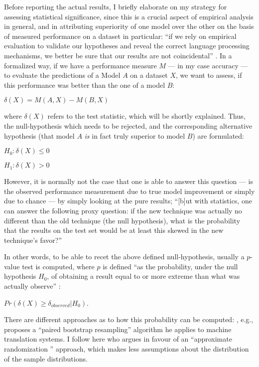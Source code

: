 Before reporting the actual results, I briefly elaborate on my strategy for
assessing statistical significance, since this is a crucial aspect of empirical
analysis in general, and in attributing superiority of one model over the other
on the basis of measured performance on a dataset in particular:
``if we rely on empirical evaluation to validate our hypotheses and reveal the
correct language processing mechanisms, we better be sure that our results are
not coincidental'' \citep{dror2018hitchhiker}. In a formalized way, if we have a
performance measure $M$ --- in my case accuracy --- to evaluate the predictions
of a Model $A$ on a dataset $X$, we want to assess, if this performance was better
than the one of a model $B$:

$\delta(X) = M(A, X) - M(B, X)$

where $\delta(X)$ refers to the test statistic, which will be shortly explained.
Thus, the null-hypothesis which needs to be rejected, and the corresponding
alternative hypothesis (that model $A$ \emph{is} in fact truly superior to model
$B$) are formulated:

$H_0:\delta(X) \leq 0$

$H_1:\delta(X) > 0$

However, it is normally not the case that one is able to answer this question --- is the observed
performance measurement due to true model improvement or simply due to chance --- by simply looking
at the pure results; ``[b]ut with statistics, one can answer the following proxy question: if the
new technique was actually no different than the old technique (the null hypothesis), what is the
probability that the results on the test set would be at least this skewed in the new technique’s
favor?'' \citep{yeh2000more}

In other words, to be able to recet the above defined null-hypothesis, usually a $p$-value test is
computed, where $p$ is defined ``as the probability, under the null hypothesis $H_0$, of obtaining
a result equal to or more extreme than what was actually observe'' \citep[p.~1384]{dror2018hitchhiker}:

$Pr(\delta(X) \geq \delta_{observed} | H_0)$.

There are different approaches as to how this probability can
be computed: \citep{koehn2004statistical}, e.g., proposes a
``paired bootstrap resampling'' algorithm he applies to machine
translation systems. I follow here \cite{morgan2005statistical} who
argues in favour of an ``approximate randomization '' approach,
which makes less assumptions about the distribution of the sample
distributions.

